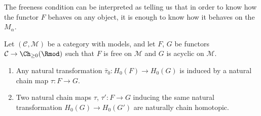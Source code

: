 \documentclass[main.tex]{subfiles}
\begin{document}
The freeness condition can be interpreted as telling us that in order to know how the functor $F$ behaves on any object, it is enough to know how it behaves on the $M_{\alpha}$.

\begin{theorem}
  \label{thm:acyclic_model_theorem}
  Let $(\mathcal{C}, \mathcal{M})$ be a category with models, and let $F$, $G$ be functors $\mathcal{C} \to \Ch_{\geq 0}(\Rmod)$ such that $F$ is free on $\mathcal{M}$ and $G$ is acyclic on $\mathcal{M}$.
  \begin{enumerate}
    \item Any natural transformation $\bar{\tau}_{0}\colon H_{0}(F) \to H_{0}(G)$ is induced by a natural chain map $\tau\colon F \to G$.

    \item Two natural chain maps $\tau$, $\tau'\colon F \to G$ inducing the same natural transformation $H_{0}(G) \to H_{0}(G')$ are naturally chain homotopic.
  \end{enumerate}
\end{theorem}
\end{document}
